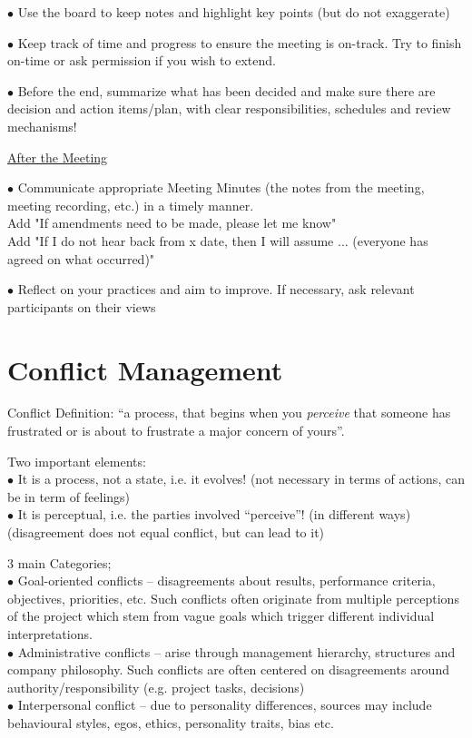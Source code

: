 \documentclass[]{project_plan}
\newcommand{\bulletPoint}{\hspace{-3.1pt}$\bullet$ \hspace{5pt}}
\begin{document}
\bulletPoint Use the board to keep notes and highlight key points (but do not exaggerate)

\bulletPoint Keep track of time and progress to ensure the meeting is on-track. Try to finish on-time or ask permission if you wish to extend.

\bulletPoint Before the end, summarize what has been decided and make sure there are decision and action items/plan, with clear
responsibilities, schedules and review mechanisms!

\underline{After the Meeting}

\bulletPoint   Communicate appropriate Meeting Minutes (the notes from the meeting, meeting recording, etc.) in a timely manner.\\
Add "If amendments need to be made, please let me know"\\
Add "If I do not hear back from x date, then I will assume ... (everyone has agreed on what occurred)"

\bulletPoint   Reflect on your practices and aim to improve. If necessary, ask relevant participants on their views

\section{Conflict Management}

Conflict Definition: “a process, that begins when you \textit{perceive} that someone has frustrated or is
about to frustrate a major concern of yours”.

Two important elements:\\
\bulletPoint It is a process, not a state, i.e. it evolves! (not necessary in terms of actions, can be in term of feelings)\\
\bulletPoint It is perceptual, i.e. the parties involved “perceive”! (in different ways)\\
(disagreement does not equal conflict, but can lead to it)

3 main Categories;\\
\bulletPoint Goal-oriented conflicts – disagreements about results, performance criteria, objectives, priorities, etc.
Such conflicts often originate from multiple perceptions of the project which stem from vague goals which
trigger different individual interpretations. \\
\bulletPoint Administrative conflicts – arise through management hierarchy, structures and company philosophy. Such
conflicts are often centered on disagreements around authority/responsibility (e.g. project tasks,
decisions)\\
\bulletPoint Interpersonal conflict – due to personality differences, sources may include behavioural styles, egos,
ethics, personality traits, bias etc.
\end{document}
